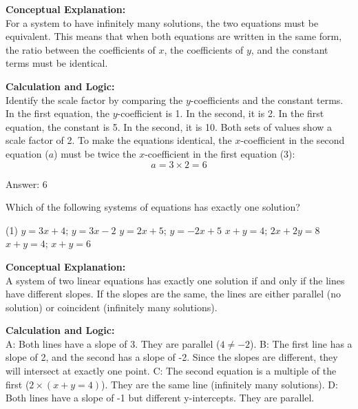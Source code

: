 \documentclass[11pt,paper=a4,answers]{exam}
\begin{document}
\begin{questions}
\begin{solution}
\textbf{Conceptual Explanation:} \\
For a system to have infinitely many solutions, the two equations must be equivalent. This means that when both equations are written in the same form, the ratio between the coefficients of $x$, the coefficients of $y$, and the constant terms must be identical.

\vspace{10pt}
\textbf{Calculation and Logic:} \\
Identify the scale factor by comparing the $y$-coefficients and the constant terms.
In the first equation, the $y$-coefficient is 1. In the second, it is 2.
In the first equation, the constant is 5. In the second, it is 10.
Both sets of values show a scale factor of 2.
To make the equations identical, the $x$-coefficient in the second equation ($a$) must be twice the $x$-coefficient in the first equation (3):
\[ a = 3 \times 2 = 6 \]

\vspace{15pt}
Answer: \colorbox{yellow!100}{6}
\end{solution}

\question
Which of the following systems of equations has exactly one solution?
\begin{tasks}(1)
    \task $y = 3x + 4$; $y = 3x - 2$
    \task $y = 2x + 5$; $y = -2x + 5$
    \task $x + y = 4$; $2x + 2y = 8$
    \task $x + y = 4$; $x + y = 6$
\end{tasks}

\begin{solution}
\textbf{Conceptual Explanation:} \\
A system of two linear equations has exactly one solution if and only if the lines have different slopes. If the slopes are the same, the lines are either parallel (no solution) or coincident (infinitely many solutions).

\vspace{10pt}
\textbf{Calculation and Logic:} \\
A: Both lines have a slope of 3. They are parallel ($4 \neq -2$).
B: The first line has a slope of 2, and the second has a slope of -2. Since the slopes are different, they will intersect at exactly one point.
C: The second equation is a multiple of the first ($2 \times (x+y=4)$). They are the same line (infinitely many solutions).
D: Both lines have a slope of -1 but different y-intercepts. They are parallel.


\end{solution}
\end{questions}
\end{document}
